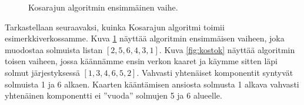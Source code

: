 \begin{figure}
\begin{center}
\end{center}
\caption{Kosarajun algoritmin ensimmäinen vaihe.}
\label{fig:koseka}
\end{figure}

Tarkastellaan seuraavaksi, kuinka Kosarajun algoritmi
toimii esimerkkiverkossamme.
Kuva \ref{fig:koseka} näyttää algoritmin ensimmäisen vaiheen,
joka muodostaa solmuista listan $[2,5,6,4,3,1]$.
Kuva \ref{fig:kostok} näyttää algoritmin toisen vaiheen,
jossa käännämme ensin verkon kaaret ja
käymme sitten läpi solmut järjestyksessä $[1,3,4,6,5,2]$.
Vahvasti yhtenäiset komponentit syntyvät
solmuista 1 ja 6 alkaen.
Kaarten kääntämisen ansiosta
solmusta 1 alkava
vahvasti yhtenäinen komponentti ei ''vuoda''
solmujen 5 ja 6 alueelle.

